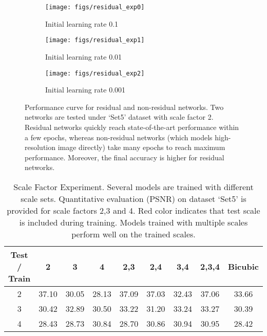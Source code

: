 \documentclass[10pt,twocolumn,letterpaper]{article}
\begin{document}
\begin{figure*}[t]
\vspace{-.3cm}
	\centering
	\begin{subfigure}{0.3\textwidth}
		\texttt{[image: figs/residual\_exp0]}
		\caption{Initial learning rate 0.1}
		\label{fig:gull}
	\end{subfigure}\hfill
\begin{subfigure}{0.3\textwidth}
		\texttt{[image: figs/residual\_exp1]}
		\caption{Initial learning rate 0.01}
		\label{fig:tiger}
	\end{subfigure}
	\hfill
	\begin{subfigure}{0.3\textwidth}
		\texttt{[image: figs/residual\_exp2]}
		\caption{Initial learning rate 0.001}
		\label{fig:mouse}
	\end{subfigure}
	\caption{Performance curve for residual and non-residual networks. Two networks are tested under `Set5' dataset with scale factor 2. Residual networks quickly reach state-of-the-art performance within a few epochs, whereas non-residual networks (which models high-resolution image directly) take many epochs to reach maximum performance. Moreover, the final accuracy is higher for residual networks.}
	\label{fig:residual2}
\end{figure*}


\begin{table*}[t]
	\small
	\centering
\begin{tabular}
{|c|c|c|c|c|c|c|c||c|}
\hline 
 Test / Train & {2}& {3}& { 4}& {2,3}& {2,4}& { 3,4}& {2,3,4} & {Bicubic} \\
\hline
2  & \color{red} 37.10  & 30.05  & 28.13  & \color{red} 37.09  & \color{red} 37.03  & 32.43  & \color{red}37.06 &33.66   \\
3  & 30.42  & \color{red} 32.89  & 30.50  & \color{red} 33.22  & 31.20  & \color{red} 33.24  & \color{red} 33.27  & 30.39 \\
4  & 28.43  & 28.73  & \color{red} 30.84  & 28.70  & \color{red} 30.86  & \color{red} 30.94  & \color{red} 30.95 & 28.42  \\
\hline
\end{tabular}
	\vspace{1pt}
	\caption{Scale Factor Experiment. Several models are trained with different scale sets. Quantitative evaluation (PSNR) on dataset `Set5' is provided for scale factors 2,3 and 4.  {\color{red}Red color} indicates that test scale is included during training. Models trained with multiple scales perform well on the trained scales. }
	\label{tab:SRCNN_Factor_Test}
\end{table*}
\end{document}
